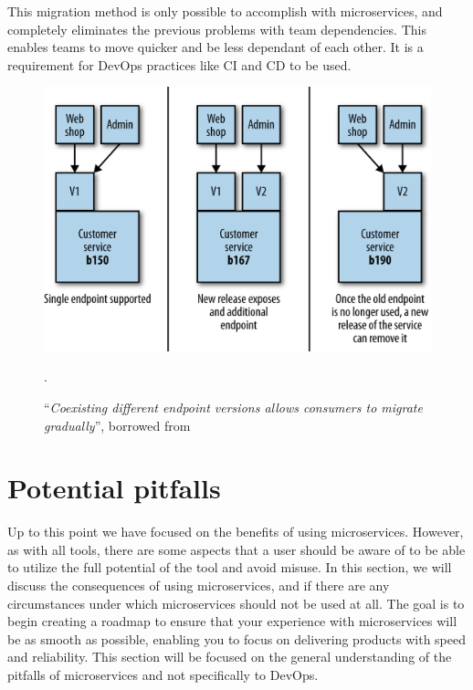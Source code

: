 \documentclass[a4paper]{article}
\begin{document}
This migration method is only possible to accomplish with microservices, and completely eliminates the previous problems with team dependencies. This enables teams to move quicker and be less dependant of each other. It is a requirement for DevOps practices like CI and CD to be used.

\begin{figure}[h]
    \centering
    \includegraphics[width=\textwidth]{microservice-versioning.png}
    \caption{``\textit{Coexisting different endpoint versions allows consumers to migrate gradually}'', borrowed from \cite{Newman2015}}.
    \label{fig:microservice-versioning}
\end{figure}


\pagebreak
\section{Potential pitfalls}
\label{sec:pitfalls}

Up to this point we have focused on the benefits of using microservices. However, as with all tools, there are some aspects that a user should be aware of to be able to utilize the full potential of the tool and avoid misuse. In this section, we will discuss the consequences of using microservices, and if there are any circumstances under which microservices should not be used at all. The goal is to begin creating a roadmap to ensure that your experience with microservices will be as smooth as possible, enabling you to focus on delivering products with speed and reliability. This section will be focused on the general understanding of the pitfalls of microservices and not specifically to DevOps.
\end{document}
